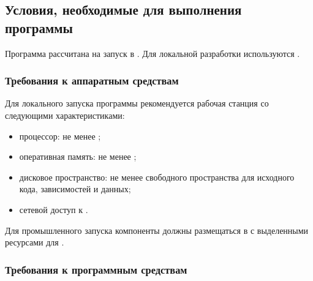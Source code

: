 \documentclass[12pt,a4paper]{extarticle}
\begin{document}
\subsection{Условия, необходимые для выполнения программы}

\begin{hseExample}
Программа рассчитана на запуск в . Для локальной разработки используются .
\end{hseExample}

\subsubsection{Требования к аппаратным средствам}

\begin{hseExample}
Для локального запуска программы рекомендуется рабочая станция со следующими характеристиками:

\begin{itemize}[leftmargin=1.25cm]
    \item процессор: не менее ;
    \item оперативная память: не менее ;
    \item дисковое пространство: не менее  свободного пространства для исходного кода, зависимостей и данных;
    \item сетевой доступ к .
\end{itemize}

Для промышленного запуска компоненты должны размещаться в  с выделенными ресурсами для .
\end{hseExample}

\subsubsection{Требования к программным средствам}
\end{document}
